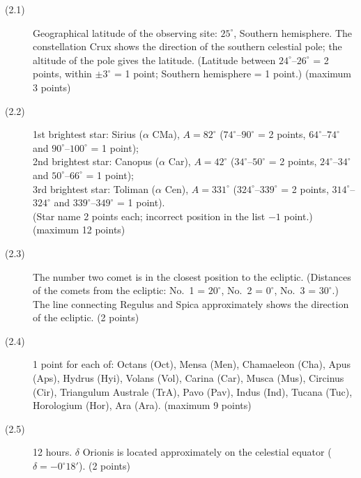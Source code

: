 \begin{description}
\item[(2.1)] Geographical latitude of the observing site: $25^\circ$,
  Southern hemisphere. The constellation Crux shows the direction of the
  southern celestial pole; the altitude of the pole gives the latitude.
  (Latitude between $24^\circ$--$26^\circ$ = 2 points, within $\pm 3^\circ$
  = 1 point; Southern hemisphere = 1 point.) \hfill(maximum 3 points)
\item[(2.2)] %
  1st brightest star: Sirius ($\alpha$ CMa), $A = 82^\circ$
  ($74^\circ$--$90^\circ$ = 2 points, $64^\circ$--$74^\circ$ and
  $90^\circ$--$100^\circ$ = 1 point);\\
  2nd brightest star: Canopus ($\alpha$ Car), $A = 42^\circ$
  ($34^\circ$--$50^\circ$ = 2 points, $24^\circ$--$34^\circ$ and
  $50^\circ$--$66^\circ$ = 1 point);\\
  3rd brightest star: Toliman ($\alpha$ Cen), $A = 331^\circ$
  ($324^\circ$--$339^\circ$ = 2 points, $314^\circ$--$324^\circ$ and
  $339^\circ$--$349^\circ$ = 1 point).\\
  (Star name 2 points each; incorrect position in the list $-1$ point.)
  \hfill(maximum 12 points)
\item[(2.3)] The number two comet is in the closest position to the
  ecliptic. (Distances of the comets from the ecliptic: No.\ 1 =
  $20^\circ$, No.\ 2 = $0^\circ$, No.\ 3 = $30^\circ$.) The line
  connecting Regulus and Spica approximately shows the direction of the
  ecliptic. \hfill(2 points)
\item[(2.4)] 1 point for each of: Octans (Oct), Mensa (Men), Chamaeleon
  (Cha), Apus (Aps), Hydrus (Hyi), Volans (Vol), Carina (Car), Musca
  (Mus), Circinus (Cir), Triangulum Australe (TrA), Pavo (Pav), Indus
  (Ind), Tucana (Tuc), Horologium (Hor), Ara (Ara).
  \hfill(maximum 9 points)
\item[(2.5)] 12 hours. $\delta$ Orionis is located approximately on the
  celestial equator ($\delta = -0^\circ 18'$). \hfill(2 points)
\end{description}

